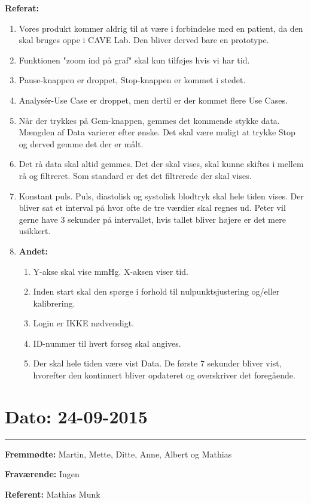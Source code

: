 \textbf{Referat:}
\begin{enumerate}
\item Vores produkt kommer aldrig til at være i forbindelse med en patient, da den skal bruges oppe i CAVE Lab. Den bliver derved bare en prototype.
\item Funktionen "zoom ind på graf" skal kun tilføjes hvis vi har tid.
\item Pause-knappen er droppet, Stop-knappen er kommet i stedet.
\item Analysér-Use Case er droppet, men dertil er der kommet flere Use Cases.
\item Når der trykkes på Gem-knappen, gemmes det kommende stykke data. Mængden af Data varierer efter ønske. Det skal være muligt at trykke Stop og derved gemme det der er målt.
\item Det rå data skal altid gemmes. Det der skal vises, skal kunne skiftes i mellem rå og filtreret. Som standard er det det filtrerede der skal vises.
\item Konstant puls. Puls, diastolisk og systolisk 	blodtryk skal hele tiden vises. Der bliver sat et interval på hvor ofte de tre værdier skal regnes ud. Peter vil gerne have 3 sekunder på intervallet, hvis tallet bliver højere er det mere usikkert. 
\item \textbf{Andet:}
\begin{enumerate}
\item Y-akse skal vise mmHg. X-aksen viser tid.
\item Inden start skal den spørge i forhold til nulpunktsjustering og/eller kalibrering.
\item Login er IKKE nødvendigt.
\item ID-nummer til hvert forsøg skal angives.
\item Der skal hele tiden være vist Data. De første 7 sekunder bliver vist, hvorefter den kontinuert bliver opdateret og overskriver det foregående.
\end{enumerate}
\end{enumerate}


\section{Dato: 24-09-2015}
\hrule

\textbf{Fremmødte:} Martin, Mette, Ditte, Anne, Albert og Mathias 

\textbf{Fraværende:} Ingen

\textbf{Referent:} Mathias Munk

